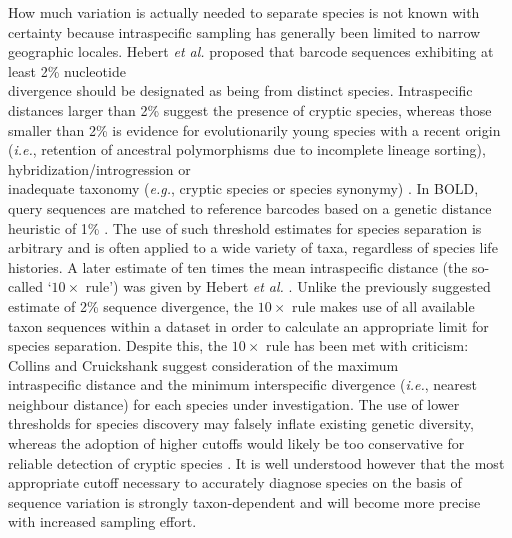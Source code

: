 How much variation is actually needed to separate species is not known with certainty because intraspecific sampling has generally been limited to narrow geographic locales. Hebert \textit{et al.} \cite{hebert2003biological} proposed that barcode sequences exhibiting at least 2\% nucleotide \\ divergence should be designated as being from distinct species. Intraspecific distances larger than 2\% suggest the presence of cryptic species, whereas those smaller than 2\% is evidence for evolutionarily young species with a recent origin (\textit{i.e.}, retention of ancestral polymorphisms due to incomplete lineage sorting), hybridization/introgression or \\ inadequate taxonomy (\textit{e.g.}, cryptic species or species synonymy) \cite{hubert2015dna}. In BOLD, query sequences are matched to reference barcodes based on a genetic distance heuristic of 1\% \cite{ratnasingham2007bold}. The use of such threshold estimates for species separation is arbitrary and is often applied to a wide variety of taxa, regardless of species life histories. A later estimate of ten times the mean intraspecific distance (the so-called `$10\times$ rule') was given by Hebert \textit{et al.} \cite{hebert2004identification}. Unlike the previously suggested estimate of 2\% sequence divergence, the $10\times$ rule makes use of all available taxon sequences within a dataset in order to calculate an appropriate limit for species separation. Despite this, the $10\times$ rule has been met with criticism: Collins and Cruickshank \cite{collins2013seven} suggest consideration of the maximum \\ intraspecific distance and the minimum interspecific divergence (\textit{i.e.}, nearest neighbour distance) for each species under investigation. The use of lower thresholds for species discovery may falsely inflate existing genetic diversity, whereas the adoption of higher cutoffs would likely be too conservative for reliable detection of cryptic species \cite{april2011genetic}. It is well understood however that the most appropriate cutoff necessary to accurately diagnose species on the basis of sequence variation is strongly taxon-dependent \cite{hebert2003barcoding, hickerson2006dna, meyer2005dna} and will become more precise with increased sampling effort.

\vspace{5mm}


